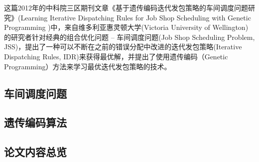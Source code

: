 这篇2012年的中科院三区期刊文章《基于遗传编码迭代发包策略的车间调度问题研究》(Learning Iterative Dispatching Rules for Job Shop Scheduling with Genetic Programming \cite{nguyenLearningIterativeDispatching2013})中，来自维多利亚惠灵顿大学(Victoria University of Wellington)的研究者针对经典的组合优化问题 -- 车间调度问题(Job Shop Scheduling Problem, JSS)，提出了一种可以不断在之前的错误分配中改进的迭代发包策略(Iterative Dispatching Rules, IDR)来获得最优解，并提出了使用遗传编码（Genetic Programming）方法来学习最优迭代发包策略的技术。

\subsection{车间调度问题}

\subsection{遗传编码算法}

\subsection{论文内容总览}

